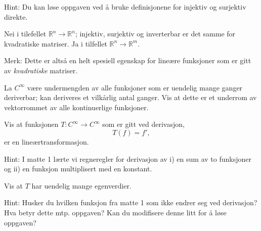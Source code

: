 \begin{losning}

\begin{punkt}
Hint: Du kan løse oppgaven ved å bruke definisjonene for injektiv og surjektiv direkte.
\end{punkt}

\begin{punkt}
Nei i tilefellet $\mathbb{R}^n\rightarrow \mathbb{R}^n$; injektiv, surjektiv og inverterbar er det samme for kvadratiske matriser. Ja i tilfellet $\mathbb{R}^n\rightarrow \mathbb{R}^m$.


\noindent
Merk: Dette er altså en helt spesiell egenskap for lineære funksjoner som er gitt av \emph{kvadratiske} matriser.
\end{punkt}


\end{losning}

\begin{oppgave}
\begin{punkt}
La $C^\infty$ være undermengden av alle funksjoner som er uendelig mange ganger deriverbar; kan deriveres et vilkårlig antal ganger. Vis at dette er et underrom av vektorrommet av alle kontinuerlige funksjoner.
\end{punkt}

\begin{punkt}
Vis at funksjonen $T:C^\infty\rightarrow C^\infty$ som er gitt ved derivasjon, $$T(f)=f',$$ er en lineærtransformasjon.

\noindent
Hint: I matte 1 lærte vi regneregler for derivasjon av i) en sum av to funksjoner og ii) en funksjon multiplisert med en konstant.
\end{punkt}

\begin{punkt}
Vis at $T$ har uendelig mange egenverdier.

\noindent 
Hint: Husker du hvilken funksjon fra matte 1 som ikke endrer seg ved derivasjon? Hva betyr dette mtp. oppgaven? Kan du modifisere denne litt for å løse oppgaven?
\end{punkt}
\end{oppgave}
